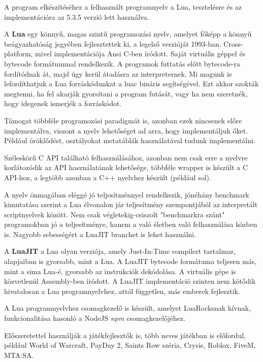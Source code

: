 
A program elkészítéséhez a felhasznált programnyelv a Lua, tesztelésre és az implementációra az 5.3.5 verzió lett használva.

A \textbf{Lua} egy könnyű, magas szintű programozási nyelv, amelyet főképp a könnyű beágyazhatóság jegyében fejlesztettek ki, a legelső verzióját 1993-ban. Cross-platform, mivel implementációja Ansi C-ben íródott. Saját virtuális géppel és bytecode formátummal rendelkezik.
A programok futtatás előtt bytecode-ra fordítódnak át, majd úgy kerül átadásra az interpreternek. Mi magunk is lefordíthatjuk a Lua forráskódunkat a luac bináris segítségével.
Ezt akkor szokták megtenni, ha fel akarják gyorsítani a program futását, vagy ha nem szeretnék, hogy idegenek ismerjék a forráskódot.

Támogat többféle programozási paradigmát is, azonban ezek nincsenek előre implementálva, viszont a nyelv lehetőséget ad arra, hogy implementáljuk őket. Például öröklődést, osztályokat metatáblák használatával tudunk implementálni. \cite{ooplua}

Széleskörű C API található felhasználásához, azonban nem csak erre a nyelvre korlátozódik az API használatának lehetősége, többféle wrapper is készült a C API-hoz, a legtöbb azonban a C++ nyelvhez készült (például sol).

A nyelv önmagában eléggé jó teljesítménnyel rendelkezik, jónéhány benchmark kimutatása szerint a Lua élvonalon jár teljesítmény szempontjából az interpretált scriptnyelvek között. Nem csak végletekig-csiszolt "benchmarkra szánt" programokban jó a teljesítménye, hanem a való életben való felhasználása közben is. Nagyobb sebességért a LuaJIT branchet is lehet használni.

A \textbf{LuaJIT} a Lua olyan verziója, amely Just-In-Time compilert tartalmaz, alapjaiban is gyorsabb, mint a Lua. A LuaJIT bytecode formátuma teljesen más, mint a sima Lua-é, gyorsabb az instrukciók dekódolása. A virtuális gépe is közvetlenül Assembly-ben íródott. A LuaJIT implementáció szinten nem kötődik hivatalosan a Lua programnyelvhez, attól független, más emberek fejlesztik. \cite {luajit}

A Lua programnyelvhez csomagkezelő is készült, amelyet LuaRocksnak hívnak, funkcionalitása hasonló a NodeJS \textit{npm} csomagkezelőjéhez.

Előszeretettel használják a játékfejlesztők is, több neves játékban is előfordul, például World of Warcraft, PayDay 2, Saints Row széria, Crysis, Roblox, FiveM, MTA:SA. \cite{usageoflua}

